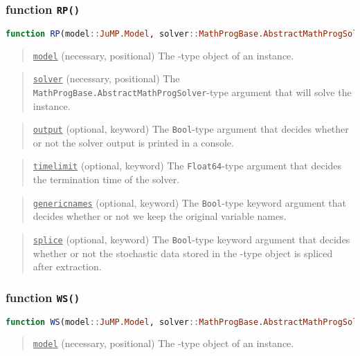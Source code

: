 \subsubsection{function \texttt{RP()}}
\begin{lstlisting}[frame=single,language=julia]
function RP(model::JuMP.Model, solver::MathProgBase.AbstractMathProgSolver; output::Bool=false, timelimit::Float64=Inf, genericnames::Bool=true, splice::Bool=false)
\end{lstlisting}
\begin{quote}
	\noindent\underline{\texttt{model}} (necessary, positional) The \jumpmodel-type object of an instance.
\end{quote}

\begin{quote}
	\noindent\underline{\texttt{solver}} (necessary, positional) The \texttt{MathProgBase.AbstractMathProgSolver}-type argument that will solve the instance.
\end{quote}

\begin{quote}
	\noindent\underline{\texttt{output}} (optional, keyword) The \texttt{Bool}-type argument that decides whether or not the solver output is printed in a console.
\end{quote}

\begin{quote}
	\noindent\underline{\texttt{timelimit}} (optional, keyword) The \texttt{Float64}-type argument that decides the termination time of the solver.
\end{quote}

\begin{quote}
	\noindent\underline{\texttt{genericnames}} (optional, keyword) The \texttt{Bool}-type keyword argument that decides whether or not we keep the original variable names. 
\end{quote}

\begin{quote}
	\noindent\underline{\texttt{splice}} (optional, keyword) The \texttt{Bool}-type keyword argument that decides whether or not the stochastic data stored in the \jumpmodel-type object is spliced after extraction.
\end{quote}

\subsubsection{function \texttt{WS()}}
\begin{lstlisting}[frame=single,language=julia]
function WS(model::JuMP.Model, solver::MathProgBase.AbstractMathProgSolver; output::Bool=false, ss_timelimit::Float64=Inf, splice::Bool=false)
\end{lstlisting}
\begin{quote}
	\noindent\underline{\texttt{model}} (necessary, positional) The \jumpmodel-type object of an instance.
\end{quote}

